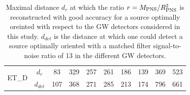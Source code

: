 \begin{table}
\begin{tabular}{c|c|cccccccc}
\hline
\multirow{2}{*}{ET\_D} & $d_{r}$ & 83  & 329 & 257 & 261 & 186 & 139 & 369 & 523 \\
\cline{2-10}
                       & $d_{det}$ & 107 & 368 & 271 & 285 & 213 & 174 & 796  & 661\\

  \end{tabular}
  \caption{%
    Maximal distance $d_{r}$ at which the ratio $r=M_{\rm PNS}/R_{\rm PNS}^2$ is reconstructed
    with good accuracy for a source optimally oreinted with respect to the GW detectors
    considered in this study. $d_{det}$ is the distance at which one could detect a source
    optimally oriented with a matched filter signal-to-noise ratio of 13 in the  different
    GW detectors.
  }
  \label{tab:results}
\end{table}

